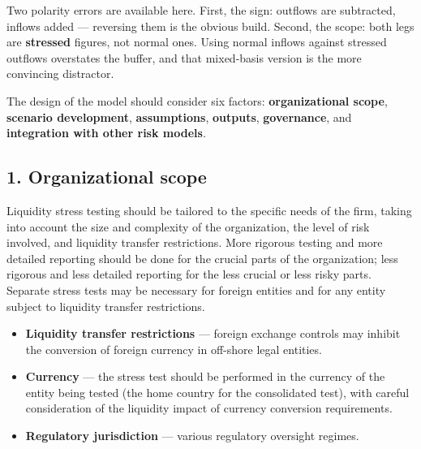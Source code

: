 \begin{lrtrapbox}
Two polarity errors are available here. First, the sign: outflows are subtracted, inflows added --- reversing them is the obvious build. Second, the scope: both legs are \textbf{stressed} figures, not normal ones. Using normal inflows against stressed outflows overstates the buffer, and that mixed-basis version is the more convincing distractor.
\end{lrtrapbox}


The design of the model should consider six factors: \textbf{organizational scope}, \textbf{scenario development}, \textbf{assumptions}, \textbf{outputs}, \textbf{governance}, and \textbf{integration with other risk models}.

\subsection{1. Organizational scope}

Liquidity stress testing should be tailored to the specific needs of the firm, taking into account the size and complexity of the organization, the level of risk involved, and liquidity transfer restrictions. More rigorous testing and more detailed reporting should be done for the crucial parts of the organization; less rigorous and less detailed reporting for the less crucial or less risky parts. Separate stress tests may be necessary for foreign entities and for any entity subject to liquidity transfer restrictions.

\begin{itemize}
\item \textbf{Liquidity transfer restrictions} --- foreign exchange controls may inhibit the conversion of foreign currency in off-shore legal entities.
\item \textbf{Currency} --- the stress test should be performed in the currency of the entity being tested (the home country for the consolidated test), with careful consideration of the liquidity impact of currency conversion requirements.
\item \textbf{Regulatory jurisdiction} --- various regulatory oversight regimes.
\end{itemize}


